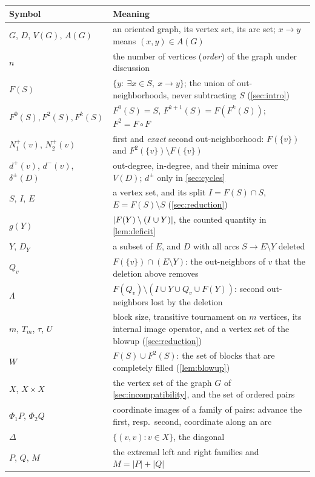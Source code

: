 {\small
\renewcommand{\arraystretch}{1.16}
\noindent\begin{tabularx}{\textwidth}{@{}lX@{}}
\toprule
\textbf{Symbol} & \textbf{Meaning} \\
\midrule
$G$, $D$, $V(G)$, $A(G)$ & an oriented graph, its vertex set, its arc set; $x\to y$ means $(x,y)\in A(G)$ \\
$n$ & the number of vertices (\emph{order}) of the graph under discussion \\
$F(S)$ & $\{y:\ \exists x\in S,\ x\to y\}$; the union of out-neighborhoods, never subtracting $S$ (\cref{sec:intro}) \\
$F^0(S),F^2(S),F^k(S)$ & $F^0(S)=S$, $F^{k+1}(S)=F(F^k(S))$; $F^2=F\circ F$ \\
$N_1^+(v)$, $N_2^+(v)$ & first and \emph{exact} second out-neighborhood: $F(\{v\})$ and $F^2(\{v\})\setminus F(\{v\})$ \\
$d^+(v)$, $d^-(v)$, $\delta^\pm(D)$ & out-degree, in-degree, and their minima over $V(D)$; $d^\pm$ only in \cref{sec:cycles} \\
$S$, $I$, $E$ & a vertex set, and its split $I=F(S)\cap S$, $E=F(S)\setminus S$ (\cref{sec:reduction}) \\
$g(Y)$ & $\lvert F(Y)\setminus(I\cup Y)\rvert$, the counted quantity in \cref{lem:deficit} \\
$Y$, $D_Y$ & a subset of $E$, and $D$ with all arcs $S\to E\setminus Y$ deleted \\
$Q_v$ & $F(\{v\})\cap(E\setminus Y)$: the out-neighbors of $v$ that the deletion above removes \\
$\Lambda$ & $F(Q_v)\setminus(I\cup Y\cup Q_v\cup F(Y))$: second out-neighbors lost by the deletion \\
$m$, $T_m$, $\tau$, $U$ & block size, transitive tournament on $m$ vertices, its internal image operator, and a vertex set of the blowup (\cref{sec:reduction}) \\
$W$ & $F(S)\cup F^2(S)$: the set of blocks that are completely filled (\cref{lem:blowup}) \\
$X$, $X\times X$ & the vertex set of the graph $G$ of \cref{sec:incompatibility}, and the set of ordered pairs \\
$\Phi_1 P$, $\Phi_2 Q$ & coordinate images of a family of pairs: advance the first, resp.\ second, coordinate along an arc \\
$\Delta$ & $\{(v,v):v\in X\}$, the diagonal \\
$P$, $Q$, $M$ & the extremal left and right families and $M=|P|+|Q|$ \\

\end{tabularx}}
